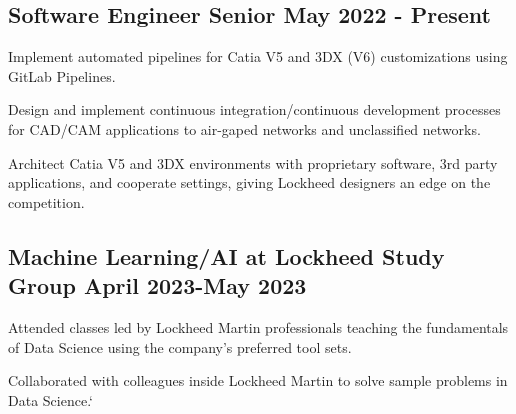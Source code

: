 \subsection{{Software Engineer Senior \hfill May 2022 - Present}}
\begin{zitemize}
\item Implement automated pipelines for Catia V5 and 3DX (V6) customizations using GitLab Pipelines.
\item Design and implement continuous integration/continuous development  processes for CAD/CAM applications to air-gaped networks and unclassified networks.\\
\item Architect Catia V5 and 3DX environments with proprietary software, 3rd party applications, and cooperate settings, giving Lockheed designers an edge on the competition. 
\end{zitemize}

\subsection{{Machine Learning/AI at Lockheed Study Group \hfill April 2023-May 2023}}
\begin{zitemize}
\item Attended classes led by Lockheed Martin professionals teaching the fundamentals of Data Science using the company's preferred tool sets.
\item Collaborated with colleagues inside Lockheed Martin to solve sample problems in Data Science.`
\end{zitemize}

